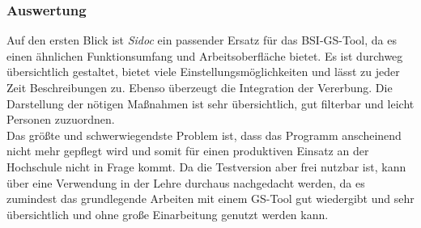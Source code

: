 \subsubsection{Auswertung}
Auf den ersten Blick ist \textit{Sidoc} ein passender Ersatz für das BSI-GS-Tool, da es einen ähnlichen Funktionsumfang und Arbeitsoberfläche bietet. Es ist durchweg übersichtlich gestaltet, bietet viele Einstellungsmöglichkeiten und lässt zu jeder Zeit Beschreibungen zu. Ebenso überzeugt die Integration der Vererbung. Die Darstellung der nötigen Maßnahmen ist sehr übersichtlich, gut filterbar und leicht Personen zuzuordnen.\\
Das größte und schwerwiegendste Problem ist, dass das Programm anscheinend nicht mehr gepflegt wird und somit für einen produktiven Einsatz an der Hochschule nicht in Frage kommt. Da die Testversion aber frei nutzbar ist, kann über eine Verwendung in der Lehre durchaus nachgedacht werden, da es zumindest das grundlegende Arbeiten mit einem GS-Tool gut wiedergibt und sehr übersichtlich und ohne große Einarbeitung genutzt werden kann.